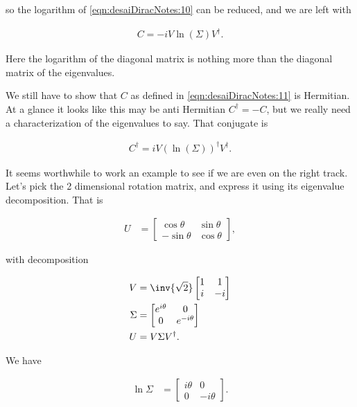 so the logarithm of \ref{eqn:desaiDiracNotes:10} can be reduced, and we are left with

\begin{align}\label{eqn:desaiDiracNotes:11}
C = -i V \ln ( \Sigma ) V^\dagger.
\end{align}

Here the logarithm of the diagonal matrix is nothing more than the diagonal matrix of the eigenvalues.

We still have to show that $C$ as defined in \ref{eqn:desaiDiracNotes:11} is Hermitian.  At a glance it looks like this may be anti Hermitian $C^\dagger = -C$, but we really need a characterization of the eigenvalues to say.  That conjugate is

\begin{align}\label{eqn:desaiDiracNotes:11b}
C^\dagger = i V (\ln ( \Sigma ))^\dagger V^\dagger.
\end{align}

It seems worthwhile to work an example to see if we are even on the right track.  Let's pick the 2 dimensional rotation matrix, and express it using its eigenvalue decomposition.  That is

\begin{align}\label{eqn:desaiDiracNotes:12}
U &= 
\begin{bmatrix}
\cos\theta & \sin\theta \\
-\sin\theta & \cos\theta
\end{bmatrix},
\end{align}

with decomposition

\begin{align}\label{eqn:desaiDiracNotes:12b}
V &= \inv{\sqrt{2}} 
\begin{bmatrix}
1 & 1 \\
i & -i \\
\end{bmatrix} \\
\Sigma &= 
\begin{bmatrix}
e^{i\theta} & 0 \\
0 & e^{-i\theta} 
\end{bmatrix} \\
U &= V \Sigma V^\dagger.
\end{align}

We have

\begin{align*}
\ln \Sigma &=
\begin{bmatrix}
i\theta & 0 \\
0 & -i\theta 
\end{bmatrix}.
\end{align*}

